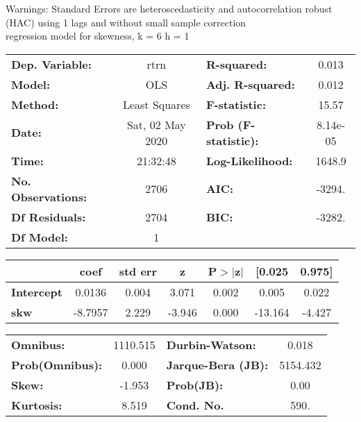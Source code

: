 Warnings: \newline
 [1] Standard Errors are heteroscedasticity and autocorrelation robust (HAC) using 1 lags and without small sample correction\\ 

regression model for skewness, k = 6 h = 1\begin{center}
\begin{tabular}{lclc}
\toprule
\textbf{Dep. Variable:}    &       rtrn       & \textbf{  R-squared:         } &     0.013   \\
\textbf{Model:}            &       OLS        & \textbf{  Adj. R-squared:    } &     0.012   \\
\textbf{Method:}           &  Least Squares   & \textbf{  F-statistic:       } &     15.57   \\
\textbf{Date:}             & Sat, 02 May 2020 & \textbf{  Prob (F-statistic):} &  8.14e-05   \\
\textbf{Time:}             &     21:32:48     & \textbf{  Log-Likelihood:    } &    1648.9   \\
\textbf{No. Observations:} &        2706      & \textbf{  AIC:               } &    -3294.   \\
\textbf{Df Residuals:}     &        2704      & \textbf{  BIC:               } &    -3282.   \\
\textbf{Df Model:}         &           1      & \textbf{                     } &             \\
\bottomrule
\end{tabular}
\begin{tabular}{lcccccc}
                   & \textbf{coef} & \textbf{std err} & \textbf{z} & \textbf{P$> |$z$|$} & \textbf{[0.025} & \textbf{0.975]}  \\
\midrule
\textbf{Intercept} &       0.0136  &        0.004     &     3.071  &         0.002        &        0.005    &        0.022     \\
\textbf{skw}       &      -8.7957  &        2.229     &    -3.946  &         0.000        &      -13.164    &       -4.427     \\
\bottomrule
\end{tabular}
\begin{tabular}{lclc}
\textbf{Omnibus:}       & 1110.515 & \textbf{  Durbin-Watson:     } &    0.018  \\
\textbf{Prob(Omnibus):} &   0.000  & \textbf{  Jarque-Bera (JB):  } & 5154.432  \\
\textbf{Skew:}          &  -1.953  & \textbf{  Prob(JB):          } &     0.00  \\
\textbf{Kurtosis:}      &   8.519  & \textbf{  Cond. No.          } &     590.  \\
\bottomrule
\end{tabular}
\end{center}

